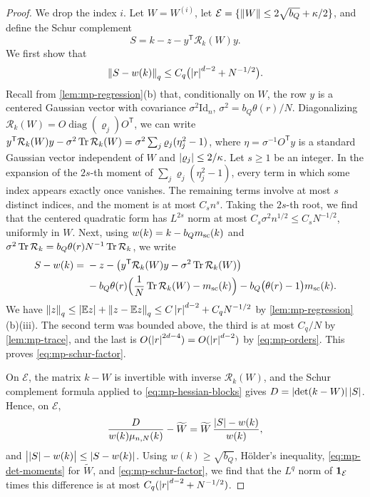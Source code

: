 \begin{proof}
We drop the index $i$. Let $W=W^{(i)}$, let $\mathcal E=\{\left\lVert W\right\rVert\le2\sqrt{b_Q}+\kappa/2\}$, and define the Schur complement
\[
S=k-z-y^{\mathsf T}\mathcal R_k(W)y.
\]
We first show that
\begin{equation}\label{eq:mp-schur-factor}
\left\lVert S-w(k)\right\rVert_q\le C_q\bigl(\left|r\right|^{d-2}+N^{-1/2}\bigr).
\end{equation}
Recall from \cref{lem:mp-regression}(b) that, conditionally on $W$, the row $y$ is a centered Gaussian vector with covariance $\sigma^2\mathrm{Id}_n$, $\sigma^2=b_Q\theta(r)/N$. Diagonalizing $\mathcal R_k(W)=O\operatorname{diag}(\varrho_j)O^{\mathsf T}$, we can write $y^{\mathsf T}\mathcal R_k(W)y-\sigma^2\operatorname{Tr}\mathcal R_k(W)=\sigma^2\sum_j\varrho_j(\eta_j^2-1)$, where $\eta=\sigma^{-1}O^{\mathsf T}y$ is a standard Gaussian vector independent of $W$ and $\left|\varrho_j\right|\le2/\kappa$. Let $s\ge1$ be an integer. In the expansion of the $2s$-th moment of $\sum_j\varrho_j(\eta_j^2-1)$, every term in which some index appears exactly once vanishes. The remaining terms involve at most $s$ distinct indices, and the moment is at most $C_sn^s$. Taking the $2s$-th root, we find that the centered quadratic form has $L^{2s}$ norm at most $C_s\sigma^2n^{1/2}\le C_sN^{-1/2}$, uniformly in $W$. Next, using $w(k)=k-b_Qm_{\rm sc}(k)$ and $\sigma^2\operatorname{Tr}\mathcal R_k=b_Q\theta(r)N^{-1}\operatorname{Tr}\mathcal R_k$, we write
\[
\begin{aligned}
S-w(k)={}&-z-\bigl(y^{\mathsf T}\mathcal R_k(W)y-\sigma^2\operatorname{Tr}\mathcal R_k(W)\bigr)\\
&-b_Q\theta(r)\Bigl(\frac1N\operatorname{Tr}\mathcal R_k(W)-m_{\rm sc}(k)\Bigr)-b_Q\bigl(\theta(r)-1\bigr)m_{\rm sc}(k).
\end{aligned}
\]
We have $\left\lVert z\right\rVert_q\le\left|\mathbb E z\right|+\left\lVert z-\mathbb E z\right\rVert_q\le C\left|r\right|^{d-2}+C_qN^{-1/2}$ by \cref{lem:mp-regression}(b)(iii). The second term was bounded above, the third is at most $C_q/N$ by \cref{lem:mp-trace}, and the last is $O(\left|r\right|^{2d-4})=O(\left|r\right|^{d-2})$ by \eqref{eq:mp-orders}. This proves \eqref{eq:mp-schur-factor}.

On $\mathcal E$, the matrix $k-W$ is invertible with inverse $\mathcal R_k(W)$, and the Schur complement formula applied to \eqref{eq:mp-hessian-blocks} gives $D=\left|\det(k-W)\right|\left|S\right|$. Hence, on $\mathcal E$,
\[
\frac D{w(k)\mu_{n,N}(k)}-\widetilde W=\widetilde W\,\frac{\left|S\right|-w(k)}{w(k)},
\]
and $\bigl|\left|S\right|-w(k)\bigr|\le\left|S-w(k)\right|$. Using $w(k)\ge\sqrt{b_Q}$, H\"older's inequality, \eqref{eq:mp-det-moments} for $\widetilde W$, and \eqref{eq:mp-schur-factor}, we find that the $L^q$ norm of $\mathbf 1_{\mathcal E}$ times this difference is at most $C_q(\left|r\right|^{d-2}+N^{-1/2})$.


\end{proof}
